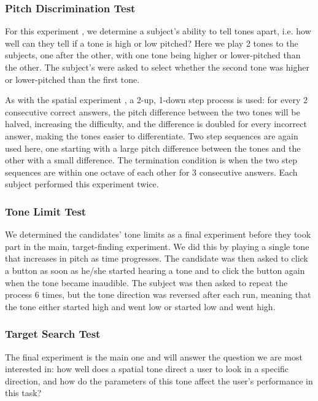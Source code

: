 \documentclass[format=sigconf, review=true, screen=true, anonymous=true]{acmart}
\begin{document}
\subsubsection{Pitch Discrimination Test}

For this experiment , we determine a subject's ability to tell tones apart, i.e. how well can they tell if a tone is high or low pitched? Here we play 2 tones to the subjects, one after the other, with one tone being higher or lower-pitched than the other. The subject's were asked to select whether the second tone was higher or lower-pitched than the first tone.

As with the spatial experiment , a 2-up, 1-down step process is used: for every 2 consecutive correct answers, the pitch difference between the two tones will be halved, increasing the difficulty, and the difference is doubled for every incorrect answer, making the tones easier to differentiate. Two step sequences are again used here, one starting with a large pitch difference between the tones and the other with a small difference. The termination condition is when the two step sequences are within one octave of each other for 3 consecutive answers. Each subject performed this experiment twice. 

\subsubsection{Tone Limit Test}

We determined the candidates' tone limits as a final experiment before they took part in the  main, target-finding experiment. We did this by playing a single tone that increases in pitch as time progresses. The candidate was then asked to click a button as soon as he/she started hearing a tone and to click the button again when the tone became inaudible. The subject was then asked to repeat the process 6 times, but the tone direction was reversed after each run, meaning that the tone either started high and went low or started low and went high. 

\subsubsection{Target Search Test}

The final experiment is the main one and will answer the question we are most interested in: how well does a spatial tone direct a user to look in a specific direction, and how do the parameters of this tone affect the user's performance in this task? 
\end{document}
